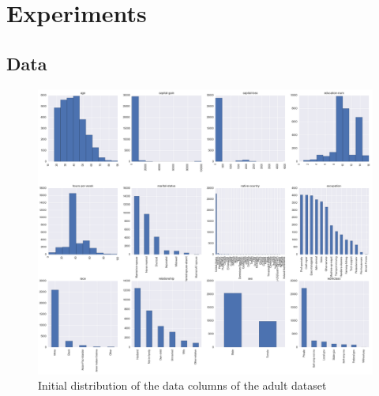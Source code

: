 \documentclass{llncs}
\begin{document}
\section{Experiments}
\label{sect:experiments}


\subsection{Data} 
\label{ssect:data}


\begin{figure}[H]
	\begin{center}
    \hspace*{-1cm}
		\includegraphics[width=1.2\textwidth]{figures/experiment/initial_distribution}
		\caption{Initial distribution of the data columns of the adult dataset}
		\label{fig:adult_original_distribution}
	\end{center}
\end{figure}
\end{document}
